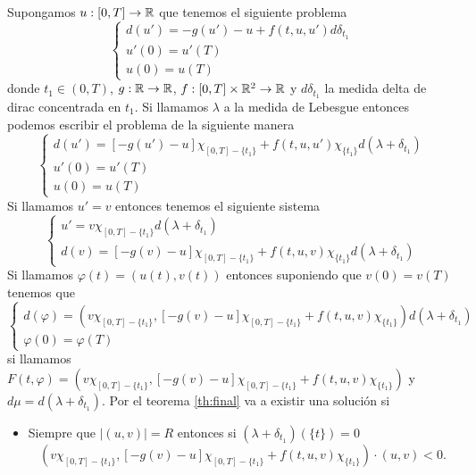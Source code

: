  \begin{example}
 	Supongamos $u:[0,T]\to \mathbb{R}$ que tenemos el siguiente problema
 	 \begin{equation*}
 		\left\lbrace \begin{array}{l}
 			d(u')=-g(u')- u+f(t,u,u')d\delta_{t_1}\\
 			u'(0)=u'(T)\\
 			u(0)=u(T)
 		\end{array}\right. 
 	\end{equation*} 
 donde $t_1\in(0,T)$, $g:\mathbb{R}\to\mathbb{R}$, $f:[0,T]\times\mathbb{R}^2\to\mathbb{R}$ y $d\delta_{t_1}$ la medida delta de dirac concentrada en $t_1$. Si llamamos $\lambda$ a la medida de Lebesgue entonces podemos escribir el problema de la siguiente manera
 \begin{equation*}
 	\left\lbrace \begin{array}{l}
 		d(u')=\left[ -g(u')- u\right] \chi_{[0,T]-\{t_1\}} +f(t,u,u')\chi_{\{t_1\}}d(\lambda+\delta_{t_1})\\
 		u'(0)=u'(T)\\
 		u(0)=u(T)
 	\end{array}\right. 
 \end{equation*} 
 Si llamamos $u'=v$ entonces tenemos el siguiente sistema
  \begin{equation*}
 	\left\lbrace \begin{array}{l}
 		u'=v\chi_{[0,T]-\{t_1\}}d(\lambda+\delta_{t_1})\\
 		d(v)=\left[ -g(v)- u \right] \chi_{[0,T]-\{t_1\}} +f(t,u,v)\chi_{\{t_1\}}d(\lambda+\delta_{t_1})
 	\end{array}\right. 
 \end{equation*} 
Si llamamos $\varphi(t)=(u(t),v(t))$ entonces suponiendo que $v(0)=v(T)$ tenemos que
  \begin{equation*}
	\left\lbrace \begin{array}{l}
		d(\varphi)=\left( v\chi_{[0,T]-\{t_1\}},\left[ -g(v)- u\right] \chi_{[0,T]-\{t_1\}} +f(t,u,v)\chi_{\{t_1\}}\right) d(\lambda+\delta_{t_1})\\
		\varphi(0)=\varphi(T)
	\end{array}\right. 
\end{equation*} 
si llamamos $F(t,\varphi)=\left( v\chi_{[0,T]-\{t_1\}}, \left[ -g(v)-u\right] \chi_{[0,T]-\{t_1\}} +f(t,u,v)\chi_{\{t_1\}}\right) $ y $d\mu=d(\lambda+\delta_{t_1})$. Por el teorema \ref{th:final} va a existir una solución si 
\begin{itemize}
	\item Siempre que $|(u,v)|=R$ entonces si $(\lambda+\delta_{t_1})(\{t\})=0$ 
	$$\left(v\chi_{[0,T]-\{t_1\}}, \left[ -g(v)- u\right] \chi_{[0,T]-\{t_1\}} +f(t,u,v)\chi_{\{t_1\}}\right) \cdot (u,v)<0.$$
	

\end{itemize}
\end{example}
